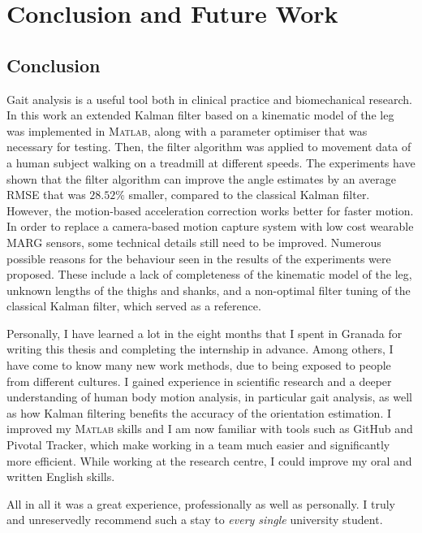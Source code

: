 \chapter{Conclusion and Future Work}
\label{ch:Conclusion and Future Work}

\section{Conclusion}

Gait analysis is a useful tool both in clinical practice and biomechanical research. In this work an extended Kalman filter based on a kinematic model of the leg was implemented in \textsc{Matlab}\textsuperscript{\textregistered}, along with a parameter optimiser that was necessary for testing. Then, the filter algorithm was applied to movement data of a human subject walking on a treadmill at different speeds. The experiments have shown that the filter algorithm can improve the angle estimates by an average RMSE that was $28.52\%$ smaller, compared to the classical Kalman filter.
However, the motion-based acceleration correction works better for faster motion. In order to replace a camera-based motion capture system with low cost wearable MARG sensors, some technical details still need to be improved. Numerous possible reasons for the behaviour seen in the results of the experiments were proposed. These include a lack of completeness of the kinematic model of the leg, unknown lengths of the thighs and shanks, and a non-optimal filter tuning of the classical Kalman filter, which served as a reference.

Personally, I have learned a lot in the eight months that I spent in Granada for writing this thesis and completing the internship in advance. Among others, I have come to know many new work methods, due to being exposed to people from different cultures. I gained experience in scientific research and a deeper understanding of human body motion analysis, in particular gait analysis, as well as how Kalman filtering benefits the accuracy of the orientation estimation. I improved my \textsc{Matlab}\textsuperscript{\textregistered} skills and I am now familiar with tools such as GitHub and Pivotal Tracker, which make working in a team much easier and significantly more efficient.  While working at the research centre, I could improve my oral and written English skills.

All in all it was a great experience, professionally as well as personally. I truly and unreservedly recommend such a stay to \emph{every single} university student.

